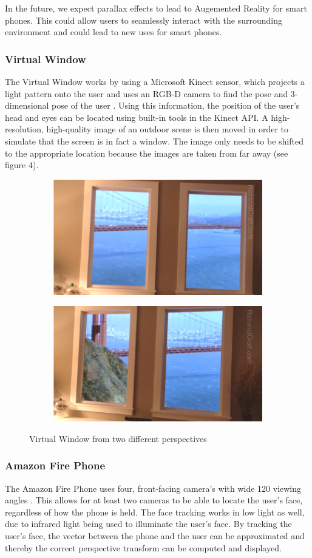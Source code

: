 \documentclass[12pt,twocolumn,letterpaper]{article}
\begin{document}
In the future, we expect parallax effects to lead to Augemented Reality for smart phones.  This could allow users to seamlessly interact with the surrounding environment and could lead to new uses for smart phones.

\subsubsection{Virtual Window}
The Virtual Window works by using a Microsoft Kinect sensor, which projects a light pattern onto the user and uses an RGB-D camera to find the pose and 3-dimensional pose of the user \cite{Winscape}.  Using this information, the position of the user's head and eyes can be located using built-in tools in the Kinect API.  A high-resolution, high-quality image of an outdoor scene is then moved in order to simulate that the screen is in fact a window.  The image only needs to be shifted to the appropriate location because the images are taken from far away (see figure 4).

\begin{figure}[!htbp]
\centering
\begin{subfigure}{0.22\textwidth}
\includegraphics[width = 35 mm]{images/win1.png}
\end{subfigure}
\begin{subfigure}{0.22\textwidth}
\includegraphics[width = 35 mm]{images/win2.png}
\end{subfigure}
\caption{Virtual Window from two different perspectives}
\end{figure}

\subsubsection{Amazon Fire Phone}
The Amazon Fire Phone uses four, front-facing camera's with wide 120 \degree viewing angles \cite{TechCrunch}.  This allows for at least two cameras to be able to locate the user's face, regardless of how the phone is held.  The face tracking works in low light as well, due to infrared light being used to illuminate the user's face.  By tracking the user's face, the vector between the phone and the user can be approximated and thereby the correct perspective transform can be computed and displayed.
\end{document}
